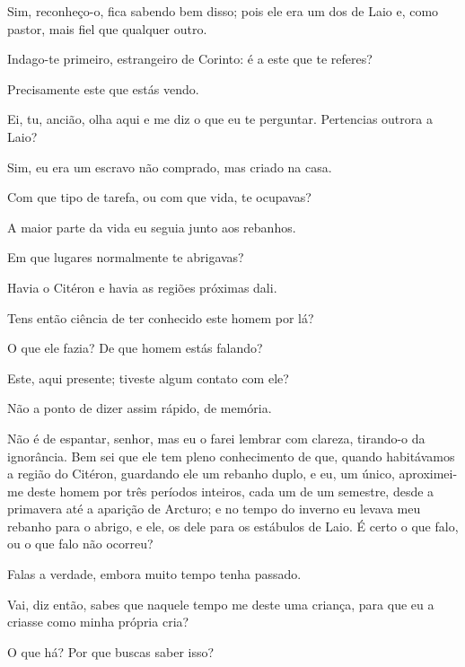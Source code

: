    Sim, reconheço-o, fica sabendo bem disso; pois ele era um dos de Laio e,
como pastor, mais fiel que qualquer outro.


   Indago-te primeiro, estrangeiro de Corinto: é a este que te
referes?

   Precisamente este que estás vendo.

   Ei, tu, ancião, olha aqui e me diz o que eu te perguntar. Pertencias
outrora a Laio?

   Sim, eu era um escravo não comprado, mas criado na casa.

   Com que tipo de tarefa, ou com que vida, te ocupavas?

   A maior parte da vida eu seguia junto aos rebanhos.

   Em que lugares normalmente te abrigavas?

   Havia o Citéron e havia as regiões próximas dali.

   Tens então ciência de ter conhecido este homem por lá?

   O que ele fazia? De que homem estás falando?

   Este, aqui presente; tiveste algum contato com ele?

   Não a ponto de dizer assim rápido, de memória.

   Não é de espantar, senhor, mas eu o farei lembrar com clareza, tirando-o
da ignorância. Bem sei que ele tem pleno conhecimento de que, quando
habitávamos a região do Citéron, guardando ele um rebanho duplo, e eu,
um único, aproximei-me deste homem por três períodos inteiros, cada um
de um semestre, desde a primavera até a aparição de Arcturo; e no tempo
do inverno eu levava meu rebanho para o abrigo, e ele, os dele
para os estábulos de Laio. É certo o que falo, ou o que falo não
ocorreu?

   Falas a verdade, embora muito tempo tenha passado.

   Vai, diz então, sabes que naquele tempo me deste uma criança, para que
eu a criasse como minha própria cria?

   O que há? Por que buscas saber isso?


